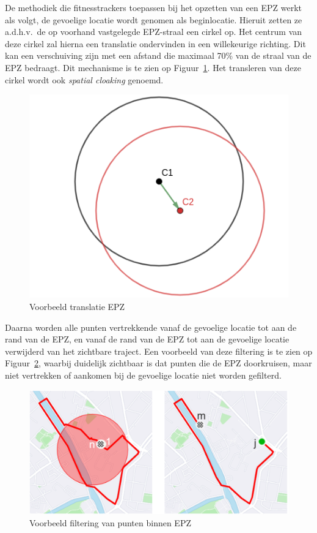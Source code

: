 De methodiek die fitnesstrackers toepassen bij het opzetten van een \ac{EPZ}
werkt als volgt, de gevoelige locatie wordt genomen als beginlocatie. Hieruit
zetten ze a.d.h.v.\ de op voorhand vastgelegde \ac{EPZ}-straal een cirkel op.
Het centrum van deze cirkel zal hierna een translatie ondervinden in een
willekeurige richting. Dit kan een verschuiving zijn met een afstand die
maximaal 70\% van de straal van de \ac{EPZ} bedraagt. Dit mechanisme is te zien
op Figuur~\ref{fig:translation}. Het transleren van deze cirkel wordt ook
\textit{spatial cloaking} genoemd.
\begin{figure}[h]
    \centering
    \includegraphics[width=0.4\linewidth]{fig/EPZ-mechanisme/Translation_Center.png}
    \caption{Voorbeeld translatie EPZ}\label{fig:translation}
\end{figure}

Daarna worden alle punten vertrekkende vanaf de gevoelige locatie tot aan de
rand van de \ac{EPZ}, en vanaf de rand van de \ac{EPZ} tot aan de gevoelige
locatie verwijderd van het zichtbare traject. Een voorbeeld van deze filtering
is te zien op Figuur~\ref{fig:drop points}, waarbij duidelijk zichtbaar is dat
punten die de \ac{EPZ} doorkruisen, maar niet vertrekken of aankomen bij de
gevoelige locatie niet worden gefilterd.
\begin{figure}[h]
    \centering
    \includegraphics[width=0.7\linewidth]{fig/EPZ-mechanisme/DropEPZPoints.png}
    \caption{Voorbeeld filtering van punten binnen \ac{EPZ}~\cite{Dhondt}}\label{fig:drop points}
\end{figure}


